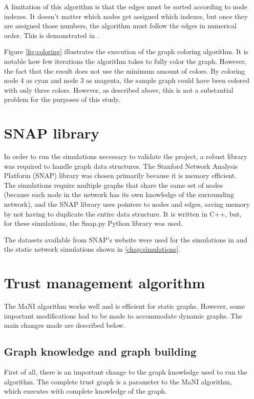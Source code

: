 A limitation of this algorithm is that the edges must be sorted according to node indexes.
It doesn't matter which nodes get assigned which indexes, but once they are assigned those numbers, the algorithm must follow the edges in numerical order.
This is demonstrated in \cite{vernize2013dissertation}.

Figure \autoref{fig:coloring} illustrates the execution of the graph coloring algorithm.
It is notable how few iterations the algorithm takes to fully color the graph.
However, the fact that the result does not use the minimum amount of colors.
By coloring node 4 as cyan and node 3 as magenta, the sample graph could have been colored with only three colors.
However, as described above, this is not a substantial problem for the purposes of this study.

\section{SNAP library}
\label{section:snap}
In order to run the simulations necessary to validate the project, a robust library was required to handle graph data structures.
The Stanford Network Analysis Platform (SNAP) library \cite{snap} was chosen primarily because it is memory efficient.
The simulations require multiple graphs that share the same set of nodes (because each node in the network has its own knowledge of the surrounding network), and the SNAP library uses pointers to nodes and edges, saving memory by not having to duplicate the entire data structure.
It is written in C++, but, for these simulations, the Snap.py Python library was used.

The datasets available from SNAP's website were used for the simulations in \cite{vernize2015malicious} and the static network simulations shown in \autoref{chap:simulations}.

\section{Trust management algorithm}
\label{section:algorithm}

The MaNI algorithm works well and is efficient for static graphs.
However, some important modifications had to be made to accommodate dynamic graphs.
The main changes made are described below.

\subsection{Graph knowledge and graph building}
First of all, there is an important change to the graph knowledge used to run the algorithm.
The complete trust graph is a parameter to the MaNI algorithm, which executes with complete knowledge of the graph.

